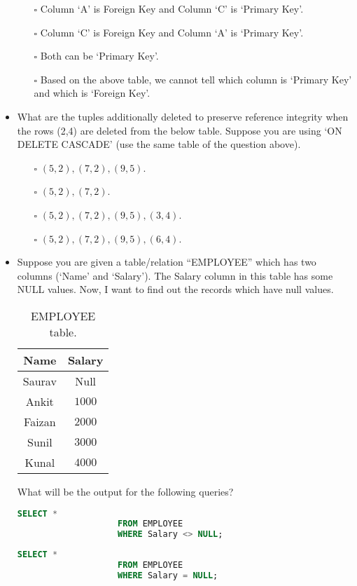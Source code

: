 \documentclass[10pt]{article}
\newcommand{\lightrule}{%
	\arrayrulecolor{black!30}%
	\midrule[\lightrulewidth]%
	\arrayrulecolor{black}}
\begin{document}
\begin{itemize}
				\begin{enumerate}
					\item[$\square$] Column ‘A’ is Foreign Key and Column ‘C’ is ‘Primary Key’.
					\item[$\square$] Column ‘C’ is Foreign Key and Column ‘A’ is ‘Primary Key’.
					\item[$\square$] Both can be ‘Primary Key’.
					\item[$\square$] Based on the above table, we cannot tell which column is ‘Primary Key’ and which is ‘Foreign Key’.
				\end{enumerate}

			\item What are the tuples additionally deleted to preserve reference integrity when the rows (2,4) are deleted from the below table. Suppose you are using ‘ON DELETE CASCADE’ (use the same table of the question above).
				\begin{enumerate}
					\item[$\square$] $(5,2), (7,2), (9,5)$.
					\item[$\square$] $(5,2), (7,2)$.
					\item[$\square$] $(5,2), (7,2), (9,5), (3,4)$.
					\item[$\square$] $(5,2), (7,2),(9,5), (6,4)$.
				\end{enumerate}
			
			\newpage

			\item Suppose you are given a table/relation “EMPLOYEE” which has two columns (‘Name’ and ‘Salary’). The Salary column in this table has some NULL values. Now, I want to find out the records which have null values.
				\begin{table}[H]
					\centering
					\begin{tabular}{@{} *{2}{c} @{}}
						\toprule
							\textbf{Name} & \textbf{Salary} \\
						\midrule
							Saurav & Null \\ 
						\lightrule
							Ankit & $1000$ \\  
						\lightrule
							Faizan & $2000$ \\
						\lightrule 
							Sunil & $3000$ \\ 
						\lightrule 
							Kunal & $4000$ \\ 
						\bottomrule
					\end{tabular}
					\caption{EMPLOYEE table.}
				\end{table}
				What will be the output for the following queries?
				\begin{lstlisting}[language=SQL,firstline=1, lastline=3] 
					SELECT * 
					FROM EMPLOYEE 
					WHERE Salary <> NULL;
				\end{lstlisting}
				\begin{lstlisting}[language=SQL,firstline=1, lastline=3] 
					SELECT * 
					FROM EMPLOYEE 
					WHERE Salary = NULL;
				\end{lstlisting}


\end{itemize}
\end{document}
